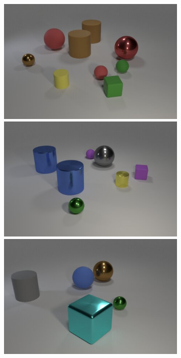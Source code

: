 \begin{figure}
\begin{subfigure}{.3225\linewidth}
\includegraphics[width=\linewidth]{figures/clevr/input/5.jpg}\\
\includegraphics[width=\linewidth]{figures/clevr/input/6.jpg}\\
\includegraphics[width=\linewidth]{figures/clevr/input/7.jpg}

\end{subfigure}
\end{figure}
